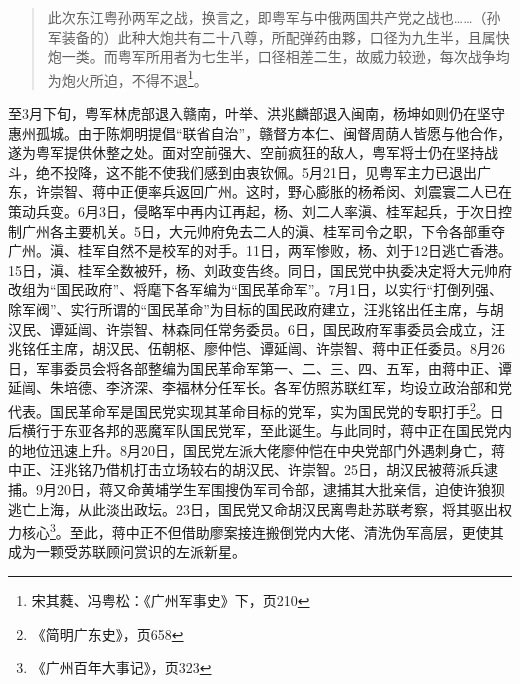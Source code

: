 \begin{quote}
此次东江粤孙两军之战，换言之，即粤军与中俄两国共产党之战也……（孙军装备的）此种大炮共有二十八尊，所配弹药由夥，口径为九生半，且属快炮一类。而粤军所用者为七生半，口径相差二生，故威力较逊，每次战争均为炮火所迫，不得不退\footnote{宋其蕤、冯粤松：《广州军事史》下，页210}。
\end{quote}

至3月下旬，粤军林虎部退入赣南，叶举、洪兆麟部退入闽南，杨坤如则仍在坚守惠州孤城。由于陈炯明提倡“联省自治”，赣督方本仁、闽督周荫人皆愿与他合作，遂为粤军提供休整之处。面对空前强大、空前疯狂的敌人，粤军将士仍在坚持战斗，绝不投降，这不能不使我们感到由衷钦佩。5月21日，见粤军主力已退出广东，许崇智、蒋中正便率兵返回广州。这时，野心膨胀的杨希闵、刘震寰二人已在策动兵变。6月3日，侵略军中再内讧再起，杨、刘二人率滇、桂军起兵，于次日控制广州各主要机关。5日，大元帅府免去二人的滇、桂军司令之职，下令各部重夺广州。滇、桂军自然不是校军的对手。11日，两军惨败，杨、刘于12日逃亡香港。15日，滇、桂军全数被歼，杨、刘政变告终。同日，国民党中执委决定将大元帅府改组为“国民政府”、将麾下各军编为“国民革命军”。7月1日，以实行“打倒列强、除军阀”、实行所谓的“国民革命”为目标的国民政府建立，汪兆铭出任主席，与胡汉民、谭延闿、许崇智、林森同任常务委员。6日，国民政府军事委员会成立，汪兆铭任主席，胡汉民、伍朝枢、廖仲恺、谭延闿、许崇智、蒋中正任委员。8月26日，军事委员会将各部整编为国民革命军第一、二、三、四、五军，由蒋中正、谭延闿、朱培德、李济深、李福林分任军长。各军仿照苏联红军，均设立政治部和党代表。国民革命军是国民党实现其革命目标的党军，实为国民党的专职打手\footnote{《简明广东史》，页658}。日后横行于东亚各邦的恶魔军队国民党军，至此诞生。与此同时，蒋中正在国民党内的地位迅速上升。8月20日，国民党左派大佬廖仲恺在中央党部门外遇刺身亡，蒋中正、汪兆铭乃借机打击立场较右的胡汉民、许崇智。25日，胡汉民被蒋派兵逮捕。9月20日，蒋又命黄埔学生军围搜伪军司令部，逮捕其大批亲信，迫使许狼狈逃亡上海，从此淡出政坛。23日，国民党又命胡汉民离粤赴苏联考察，将其驱出权力核心\footnote{《广州百年大事记》，页323}。至此，蒋中正不但借助廖案接连搬倒党内大佬、清洗伪军高层，更使其成为一颗受苏联顾问赏识的左派新星。

